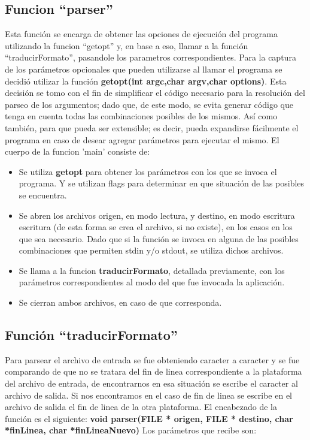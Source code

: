 \documentclass[a4paper,10pt]{article}
\begin{document}
  \subsection{Funcion ``parser''}
  Esta funci\'on se encarga de obtener las opciones de ejecuci\'on del programa utilizando la funcion ``getopt'' y, en base
  a eso, llamar a la funci\'on ``traducirFormato'', pasandole los parametros correspondientes.
  \newline
  Para la captura de los par\'ametros opcionales que pueden utilizarse al 
  llamar el programa se decidi\'o utilizar la funci\'on {\bf getopt(int argc,char\*\* argv,char\* options)}. 
  Esta decisi\'on se tomo con el fin de simplificar el c\'odigo necesario para la resoluci\'on del parseo de los
  argumentos; dado que, de este modo, se evita generar c\'odigo que tenga
  en cuenta todas las combinaciones posibles de los mismos. As\'i como
  tambi\'en, para que pueda ser extensible; es decir, pueda expandirse
  f\'acilmente el programa en caso de desear agregar par\'ametros para
  ejecutar el mismo.
  El cuerpo de la funcion 'main' consiste de:
  \begin{itemize}
  \item Se utiliza {\bf getopt} para obtener los par\'ametros con los que se invoca el programa. Y se 
    utilizan flags para determinar en que situaci\'on de las posibles se encuentra.
  \item Se abren los archivos origen, en modo lectura, y destino, en modo escritura escritura (de esta
    forma se crea el archivo, si no existe), en los casos en los que sea necesario. Dado que si la funci\'on
    se invoca en alguna de las posibles combinaciones que permiten stdin y/o stdout, se utiliza dichos 
    archivos.
  \item Se llama a la funcion {\bf traducirFormato}, detallada previamente, con los par\'ametros 
    correspondientes al modo del que fue invocada la aplicaci\'on.
  \item Se cierran ambos archivos, en caso de que corresponda.
  \end{itemize}


  \subsection{Funci\'on ``traducirFormato''}
  Para parsear el archivo de entrada se fue obteniendo caracter a caracter y
  se fue comparando de que no se tratara del fin de linea
  correspondiente a la plataforma del archivo de entrada, de
  encontrarnos en esa situaci\'on se escribe el caracter al archivo de
  salida. Si nos encontramos en el caso de fin de linea se escribe en el
  archivo de salida el fin de linea de la otra plataforma. 
  El encabezado de la funci\'on es el siguiente:
  \newline
  {\bf void parser(FILE * origen, FILE * destino, char *finLinea, char *finLineaNuevo)}
  \newline
  Los par\'ametros que recibe son:
\end{document}
